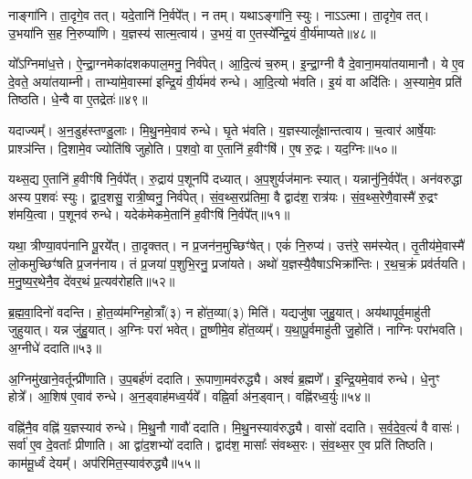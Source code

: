 नाङ्गा॑नि।
ता॒दृगे॒व तत्।
यदे॒तानि॑ नि॒र्वपे᳚त्।
न तम्।
यथाऽङ्गा॑नि॒ स्युः।
नाऽऽत्मा।
ता॒दृगे॒व तत्।
उ॒भया॑नि स॒ह नि॒रुप्या॑णि।
य॒ज्ञस्य॑ सात्म॒त्वाय॑।
उ॒भयं॒ वा ए॒तस्ये᳚न्द्रि॒यं वी॒र्य॑माप्यते॥४८॥

यो᳚ऽग्निमा॑ध॒त्ते।
ऐ॒न्द्रा॒ग्नमेका॑\-दश\-कपाल॒मनु॒ निर्व॑पेत्।
आ॒दि॒त्यं च॒रुम्।
इ॒न्द्रा॒ग्नी वै दे॒वाना॒मया॑तयामानौ।
ये ए॒व दे॒वते॒ अया॑तयाम्नी।
ताभ्या॑मे॒वास्मा॑ इन्द्रि॒यं वी॒र्य॑मव॑ रुन्धे।
आ॒दि॒त्यो भ॑वति।
इ॒यं वा अदि॑तिः।
अ॒स्यामे॒व प्रति॑ तिष्ठति।
धे॒न्वै वा ए॒तद्रेतः॑॥४९॥

यदाज्यम्᳚।
अ॒न॒डुह॑स्तण्डु॒लाः।
मि॒थु॒नमे॒वाव॑ रुन्धे।
घृ॒ते भ॑वति।
य॒ज्ञस्यालू᳚क्षान्तत्वाय।
च॒त्वार॑ आर्\mbox{}षे॒याः प्राश्ञ॑न्ति।
दि॒शामे॒व ज्योति॑षि जुहोति।
प॒शवो॒ वा ए॒तानि॑ ह॒वीꣳषि॑।
ए॒ष रु॒द्रः।
यद॒ग्निः॥५०॥

यथ्स॒द्य ए॒तानि॑ ह॒वीꣳषि॑ नि॒र्वपे᳚त्।
रु॒द्राय॑ प॒शूनपि॑ दध्यात्।
अ॒प॒शुर्यज॑मानः स्यात्।
यन्नानु॑नि॒र्वपे᳚त्।
अन॑वरुद्धा अस्य प॒शवः॑ स्युः।
द्वा॒द॒शसु॒ रात्री॒ष्वनु॒ निर्व॑पेत्।
सं॒व॒थ्स॒रप्र॑तिमा॒ वै द्वाद॑श॒ रात्र॑यः।
सं॒व॒थ्स॒रेणै॒वास्मै॑ रु॒द्रꣳ श॑मयि॒त्वा।
प॒शूनव॑ रुन्धे।
यदेक॑मेकमे॒तानि॑ ह॒वीꣳषि॑ नि॒र्वपे᳚त्॥५१॥

यथा॒ त्रीण्या॒वप॑नानि पू॒रये᳚त्।
ता॒दृक्तत्।
न प्र॒जन॑न॒\-मुच्छिꣳ॑षेत्।
एकं॑ नि॒रुप्य॑।
उत्त॑रे॒ सम॑स्येत्।
तृ॒तीय॑मे॒वास्मै॑ लो॒कमुच्छिꣳ॑षति प्र॒जन॑नाय।
तं प्र॒जया॑ प॒शुभि॒रनु॒\- प्रजा॑यते।
अथो॑ य॒ज्ञस्यै॒वैषा\-ऽभिक्रा᳚न्तिः।
र॒थ॒च॒क्रं प्रव॑र्तयति।
म॒नु॒ष्य॒र॒थेनै॒व दे॑वर॒थं प्र॒त्यव॑रोहति॥५२॥

ब्र॒ह्म॒वा॒दिनो॑ वदन्ति।
हो॒त॒व्य॑मग्निहो॒त्राँ(३) न हो॑त॒व्या(३) मिति॑।
यद्यजु॑षा जुहु॒यात्।
अय॑था\-पूर्व॒माहु॑ती जुहुयात्।
यन्न जु॑हु॒यात्।
अ॒ग्निः परा॑ भवेत्।
तू॒ष्णीमे॒व हो॑त॒व्यम्᳚।
य॒था॒पू॒र्वमाहु॑ती जु॒होति॑।
नाग्निः परा॑भवति।
अ॒ग्नीधे॑ ददाति॥५३॥

अ॒ग्निमु॑खाने॒वर्तून्प्री॑णाति।
उ॒प॒बर्\mbox{}ह॑णं ददाति।
रू॒पाणा॒मव॑\-रुद्ध्यै।
अश्वं॑ ब्र॒ह्मणे᳚।
इ॒न्द्रि॒यमे॒वाव॑ रुन्धे।
धे॒नुꣳ होत्रे᳚।
आ॒शिष॑ ए॒वाव॑ रुन्धे।
अ॒न॒ड्वाह॑मध्व॒र्यवे᳚।
वह्नि॒र्वा अ॑न॒ड्वान्।
वह्नि॑रध्व॒र्युः॥५४॥

वह्नि॑नै॒व वह्नि॑ य॒ज्ञस्याव॑ रुन्धे।
मि॒थु॒नौ गावौ॑ ददाति।
मि॒थु॒नस्याव॑रुद्ध्यै।
वासो॑ ददाति।
स॒र्व॒दे॒व॒त्यं॑ वै वासः॑।
सर्वा॑ ए॒व दे॒वताः᳚ प्रीणाति।
आ द्वा॑द॒शभ्यो॑ ददाति।
द्वाद॑श॒ मासाः᳚ संवथ्स॒रः।
सं॒व॒थ्स॒र ए॒व प्रति॑ तिष्ठति।
काम॑मू॒र्ध्वं देयम्᳚।
अप॑रिमित॒स्याव॑रुद्ध्यै॥५५॥\anuvakamend[आ॒दि॒त्ये तृती॑यम॒फ्स्वासी॒त्तत्तेनावा॑रुन्धत॒ स्यादा᳚प्यते॒ रेतो॒\-ऽग्निरेक॑मेकमे॒तानि॑ ह॒वीꣳषि॑ नि॒र्वपे᳚त्प्र॒त्यव॑रोहति ददात्यध्व॒र्युर्देय॒मेकं॑ च]

